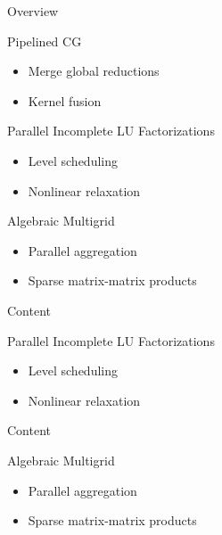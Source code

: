 







\begin{frame}{Overview}

 \begin{block}{Pipelined CG}
  \begin{itemize}
   \item Merge global reductions
   \item Kernel fusion
  \end{itemize}
 \end{block}

 \begin{block}{Parallel Incomplete LU Factorizations}
  \begin{itemize}
   \item Level scheduling
   \item Nonlinear relaxation
  \end{itemize}
 \end{block}

 \begin{block}{Algebraic Multigrid}
  \begin{itemize}
   \item Parallel aggregation
   \item Sparse matrix-matrix products
  \end{itemize}
 \end{block}

\end{frame}




\begin{frame}{Content}
 \begin{block}{Parallel Incomplete LU Factorizations}
  \begin{itemize}
   \item Level scheduling
   \item Nonlinear relaxation
  \end{itemize}
 \end{block}
\end{frame}



\begin{frame}{Content}
 \begin{block}{Algebraic Multigrid}
  \begin{itemize}
   \item Parallel aggregation
   \item Sparse matrix-matrix products
  \end{itemize}
 \end{block}
\end{frame}




